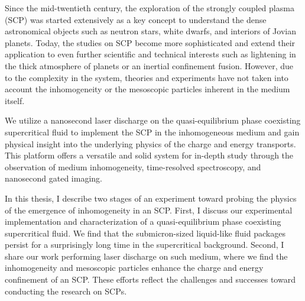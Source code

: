 
Since the mid-twentieth century, the exploration of the strongly coupled plasma (SCP) was started extensively as a key concept to understand the dense astronomical objects such as neutron stars, white dwarfs, and interiors of Jovian planets. Today, the studies on SCP become more sophisticated and extend their application to even further scientific and technical interests such as lightening in the thick atmosphere of planets or an inertial confinement fusion. However, due to the complexity in the system, theories and experiments have not taken into account the inhomogeneity or the mesoscopic particles inherent in the medium itself.

We utilize a nanosecond laser discharge on the quasi-equilibrium phase coexisting supercritical fluid to implement the SCP in the inhomogeneous medium and gain physical insight into the underlying physics of the charge and energy transports. This platform offers a versatile and solid system for in-depth study through the observation of medium inhomogeneity, time-resolved spectroscopy, and nanosecond gated imaging.

In this thesis, I describe two stages of an experiment toward probing the physics of the emergence of inhomogeneity in an SCP. First, I discuss our experimental implementation and characterization of a quasi-equilibrium phase coexisting supercritical fluid. We find that the submicron-sized liquid-like fluid packages persist for a surprisingly long time in the supercritical background. Second, I share our work performing laser discharge on such medium, where we find the inhomogeneity and mesoscopic particles enhance the charge and energy confinement of an SCP. These efforts reflect the challenges and successes toward conducting the research on SCPs.
